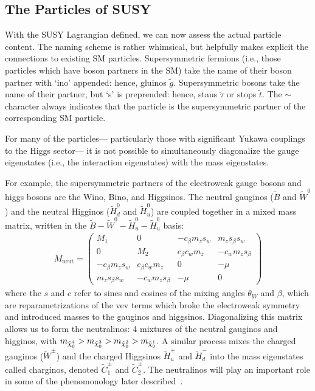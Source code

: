 \subsection{The Particles of SUSY}

With the SUSY Lagrangian defined, we can now assess the actual particle content. The naming scheme is rather whimsical, but helpfully makes explicit the connections to existing SM particles. Supersymmetric fermions (i.e., those particles which have boson partners in the SM) take the name of their boson partner with `ino' appended: hence, gluinos $\tilde{g}$. Supersymmetric bosons take the name of their partner, but `s' is preprended: hence, staus $\tilde{\tau}$ or stops $\tilde{t}$. The $\sim$ character always indicates that the particle is the supersymmetric partner of the corresponding SM particle.

For many of the particles--- particularly those with significant Yukawa couplings to the Higgs sector--- it is not possible to simultaneously diagonalize the gauge eigenstates (i.e., the interaction eigenstates) with the mass eigenstates. 

For example, the supersymmetric partners of the electroweak gauge bosons and higgs bosons are the Wino, Bino, and Higgsinos. The neutral gauginos ($\tilde{B}$ and $\tilde{W}^0$) and the neutral Higginos ($\tilde{H}^0_d$ and $\tilde{H}^0_u$) are coupled together in a mixed mass matrix,  written in the $\tilde{B}-\tilde{W}^0-\tilde{H}_u^0-\tilde{H}_u^0$ basis\cite{Martin1997}:
\begin{align}
  M_\mathrm{neut}=
\left(
\begin{array}{cccc}
 M_1 & 0 & -c_{\beta } m_z s_w &
   m_z s_{\beta } s_w \\
 0 & M_2 & c_{\beta } c_w m_z &
   -c_w m_z s_{\beta } \\
 -c_{\beta } m_z s_w & c_{\beta }
   c_w m_z & 0 & -\mu  \\
 m_z s_{\beta } s_w & -c_w m_z
   s_{\beta } & -\mu  & 0
\end{array}
\right)  \label{eqn:massx}
\end{align}
%
where the $s$ and $c$ refer to sines and cosines of the mixing angles $\theta_W$ and $\beta$, which are reparametrizations of the vev terms which broke the electroweak symmetry and introduced masses to the gauginos and higgsinos. Diagonalizing this matrix allows us to form the neutralinos: 4 mixtures of the neutral gauginos and higginos, with $m_{\tilde{\chi}_0^4} > m_{\tilde{\chi}_0^3} > m_{\tilde{\chi}_0^2} > m_{\tilde{\chi}_0^1}$. A similar process mixes the charged gauginos ($\tilde{W}^\pm$) and the charged Higgsinos $\tilde{H}^+_u$ and $\tilde{H}^-_d$ into the mass eigenstates called charginos, denoted $\tilde{C}^\pm_1$ and $\tilde{C}^\pm_2$. The neutralinos will play an important role in some of the phenomonology later described~\cite{Martin1997}.

